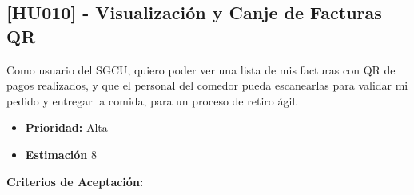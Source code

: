 \documentclass[12pt]{article}
\begin{document}
\pagebreak

\subsection{[HU010] - Visualización y Canje de Facturas QR}

Como usuario del SGCU, quiero poder ver una lista de mis facturas con QR de pagos realizados, y que el personal del comedor pueda escanearlas para validar mi pedido y entregar la comida, para un proceso de retiro ágil.

\begin{itemize}
	\item \textbf{Prioridad:} Alta
	\item \textbf{Estimación} 8
\end{itemize}

\textbf{Criterios de Aceptación:}
\end{document}
